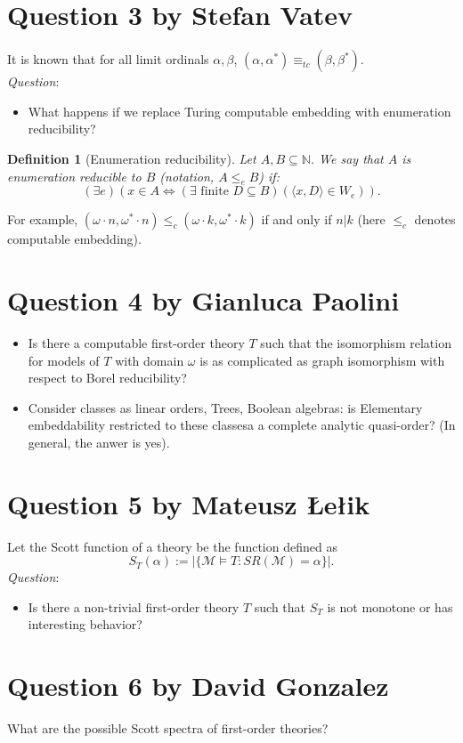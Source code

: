\documentclass{article}
\newtheorem{definition}{Definition}
\begin{document}
\section*{Question 3 {\small{by Stefan Vatev}}}
It is known that for all limit ordinals $\alpha,\beta$, $(\alpha,\alpha^*)\equiv_{tc} (\beta,\beta^*)$.\\
\textit{Question}:
\begin{itemize}
    \item What happens if we replace Turing computable embedding with enumeration reducibility?
\end{itemize}

\begin{definition}[Enumeration reducibility]
    Let $A,B \subseteq \mathbb{N}$. We say that $A$ is enumeration reducible to $B$ (notation, $A \leq_e B$) if:
    \[(\exists e)(x \in A \iff (\exists \text{ finite } D\subseteq B)(\langle x,D\rangle \in W_e)).\]
\end{definition}
For example, $(\omega\cdot n, \omega^* \cdot n) \leq_c (\omega \cdot k, \omega^* \cdot k) $ if and only if $n | k$ (here $\leq_c$ denotes computable embedding).\\


\section*{Question 4 {\small{by Gianluca Paolini}}}

\begin{itemize}
    \item Is there a computable first-order theory $T$ such that the isomorphism relation for models of $T$ with domain $\omega$ is as complicated as graph isomorphism with respect to Borel reducibility?
    \item Consider classes as linear orders, Trees, Boolean algebras: is Elementary embeddability restricted to these classesa a complete analytic quasi-order? (In general, the anwer is yes).
\end{itemize}


\section*{Question 5 {\small{by Mateusz \L{}e\l{}ik}}}
Let the Scott function of a theory  be the function defined as 
 \[S_T(\alpha):=|\{\mathcal{M} \models T : SR(\mathcal{M})= \alpha\}|.\] 
 \textit{Question}:
 \begin{itemize}
     \item Is there a non-trivial first-order theory $T$ such that $S_T$ is not monotone or has interesting behavior?
 \end{itemize}



\section*{Question 6 {\small{by David Gonzalez}}}
What are the possible Scott spectra of first-order theories?
\end{document}

